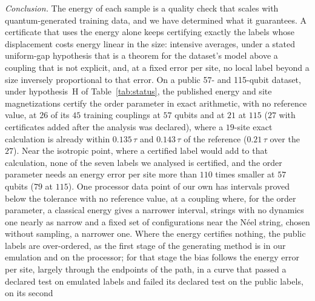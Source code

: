 \documentclass[aps,prx,twocolumn,10pt,superscriptaddress,nofootinbib,longbibliography,floatfix]{revtex4-2}
\theoremstyle{remark}
\begin{document}
\emph{Conclusion.} The energy of each sample is a quality check that scales with quantum-generated training data,
and we have determined what it guarantees. A certificate that uses the energy alone keeps certifying exactly the
labels whose displacement costs energy linear in the size: intensive averages, under a stated uniform-gap
hypothesis that is a theorem for the dataset's model above a coupling that is not explicit, and, at a fixed error
per site, no local label beyond a size inversely proportional to that error. On a public 57- and 115-qubit
dataset, under hypothesis~H of Table~\ref{tab:status}, the published energy and site magnetizations certify the %
order parameter in exact arithmetic, with no reference value, at
$26$ of its $45$ training couplings at $57$ qubits and at $21$ at $115$ ($27$ with certificates added after the %
analysis was declared), where a $19$-site exact calculation is already within %
$0.135\,\tau$ and $0.143\,\tau$ of the reference ($0.21\,\tau$ over the $27$). Near the isotropic point, where a certified label would add %
to that calculation, none of the seven labels we analysed is certified, and the order parameter needs an energy
error per site more than $110$ times smaller at $57$ qubits ($79$ at $115$). %
One processor data point of our own has intervals proved below the tolerance with no reference value, at a
coupling where, for the order parameter, a classical energy gives a narrower interval, strings with no dynamics one
nearly as narrow and a fixed set of configurations near the N\'eel string, chosen without sampling, a narrower one.
Where the energy certifies nothing, the public labels
are over-ordered, as the first stage of the generating method is in our emulation and on the processor; for that
stage the bias follows the energy error per site, largely through the endpoints of the path, in a curve that
passed a declared test on emulated labels and failed its declared test on the public labels, on its second
\end{document}
